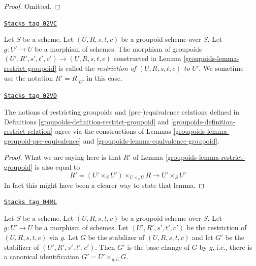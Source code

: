 \begin{proof}
Omitted.
\end{proof}

\begin{definition}
\label{groupoids-definition-restrict-groupoid}
\href{https://stacks.math.columbia.edu/tag/02VC}{\texttt{Stacks tag 02VC}}

Let $S$ be a scheme.
Let $(U, R, s, t, c)$ be a groupoid scheme over $S$.
Let $g : U' \to U$ be a morphism of schemes.
The morphism of groupoids
$(U', R', s', t', c') \to (U, R, s, t, c)$
constructed in Lemma \ref{groupoids-lemma-restrict-groupoid} is called
the {\it restriction of $(U, R, s, t, c)$ to $U'$}.
We sometime use the notation $R' = R|_{U'}$ in this case.
\end{definition}

\begin{lemma}
\label{groupoids-lemma-restrict-groupoid-relation}
\href{https://stacks.math.columbia.edu/tag/02VD}{\texttt{Stacks tag 02VD}}

The notions of restricting groupoids and
(pre-)equivalence relations defined in Definitions
\ref{groupoids-definition-restrict-groupoid} and \ref{groupoids-definition-restrict-relation}
agree via the constructions of
Lemmas \ref{groupoids-lemma-groupoid-pre-equivalence} and
\ref{groupoids-lemma-equivalence-groupoid}.
\end{lemma}

\begin{proof}

What we are saying here is that $R'$ of
Lemma \ref{groupoids-lemma-restrict-groupoid} is also
equal to
$$
R' = (U' \times_S U')\times_{U \times_S U} R
\longrightarrow
U' \times_S U'
$$
In fact this might have been a clearer way to state that lemma.
\end{proof}

\begin{lemma}
\label{groupoids-lemma-restrict-stabilizer}
\href{https://stacks.math.columbia.edu/tag/04ML}{\texttt{Stacks tag 04ML}}

Let $S$ be a scheme.
Let $(U, R, s, t, c)$ be a groupoid scheme over $S$.
Let $g : U' \to U$ be a morphism of schemes.
Let $(U', R', s', t', c')$ be the restriction of $(U, R, s, t, c)$ via $g$.
Let $G$ be the stabilizer of $(U, R, s, t, c)$ and let
$G'$ be the stabilizer of $(U', R', s', t', c')$.
Then $G'$ is the base change of $G$ by $g$, i.e.,
there is a canonical identification $G' = U' \times_{g, U} G$.
\end{lemma}

